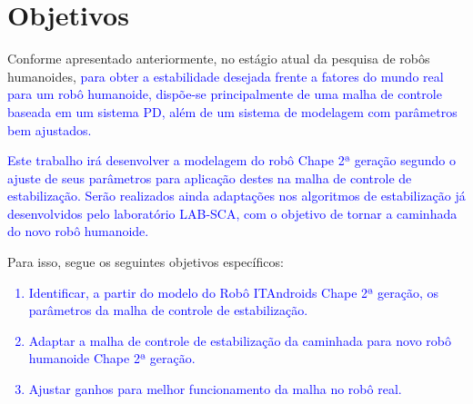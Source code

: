 \newpage

\section{Objetivos}

Conforme apresentado anteriormente, no estágio atual da pesquisa de robôs humanoides, \textcolor{blue}{para obter a estabilidade desejada frente a fatores do mundo real para um robô humanoide, dispõe-se principalmente de uma malha de controle baseada em um sistema PD, além de um sistema de modelagem com parâmetros bem ajustados.}

\textcolor{blue}{Este trabalho irá desenvolver a modelagem do robô Chape 2ª geração segundo o ajuste de seus parâmetros para aplicação destes na malha de controle de estabilização. Serão realizados ainda adaptações nos algoritmos de estabilização já desenvolvidos pelo laboratório LAB-SCA, com o objetivo de tornar a caminhada do novo robô humanoide.} 


Para isso, segue os  seguintes objetivos específicos:

\textcolor{blue}{
\begin{enumerate}
\item Identificar, a partir do modelo do Robô ITAndroids Chape 2ª geração, os parâmetros da malha de controle de estabilização.
\item Adaptar a malha de controle de estabilização da caminhada para novo robô humanoide Chape 2ª geração.
\item Ajustar ganhos para melhor funcionamento da malha no robô real.
\end{enumerate}}

